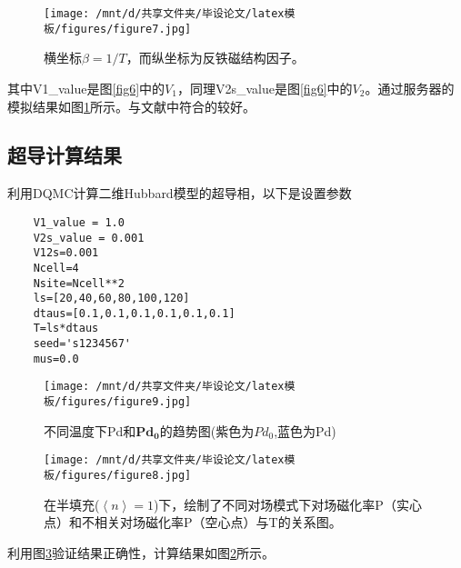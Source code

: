 \begin{figure}[h]
    \texttt{[image: /mnt/d/共享文件夹/毕设论文/latex模板/figures/figure7.jpg]}
    \caption{横坐标$\beta=1/T$，而纵坐标为反铁磁结构因子。}
    \label{fig7}
\end{figure}

其中V1\_value是图\ref{fig6}中的$V_1$，同理V2s\_value是图\ref{fig6}中的$V_2$。通过服务器的模拟结果如图\ref{fig7}所示。与文献中符合的较好。


\subsection{超导计算结果}
利用DQMC计算二维Hubbard模型的超导相，以下是设置参数
\begin{lstlisting}
    V1_value = 1.0
    V2s_value = 0.001
    V12s=0.001
    Ncell=4
    Nsite=Ncell**2
    ls=[20,40,60,80,100,120]
    dtaus=[0.1,0.1,0.1,0.1,0.1,0.1]
    T=ls*dtaus
    seed='s1234567'
    mus=0.0
\end{lstlisting}
\begin{figure}[H]
    \texttt{[image: /mnt/d/共享文件夹/毕设论文/latex模板/figures/figure9.jpg]}
    \caption{不同温度下Pd和$\mathbf{Pd_0}$的趋势图(紫色为$Pd_0$,蓝色为Pd)}
    \label{fig9}
\end{figure}

\begin{figure}[H]
    \texttt{[image: /mnt/d/共享文件夹/毕设论文/latex模板/figures/figure8.jpg]}
    \caption{在半填充($\left \langle n \right \rangle=1$)下，绘制了不同对场模式下对场磁化率P（实心点）和不相关对场磁化率P（空心点）与T的关系图。}
    \label{fig8}
\end{figure}

利用图\ref{fig8}验证结果正确性，计算结果如图\ref{fig9}所示。


























